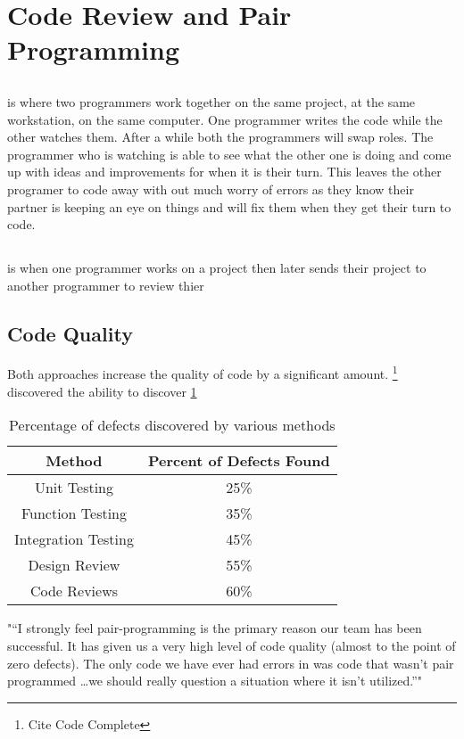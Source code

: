 \documentclass{article}
\begin{document}
\section{Code Review and Pair Programming}

\subsection{\PP}
\PP is where two programmers work together on the same project, at the same workstation, on the same computer. One programmer writes the code while the other watches them. After a while both the programmers will swap roles. The programmer who is watching is able to see what the other one is doing and come up with ideas and improvements for when it is their turn. This leaves the other programer to code away with out much worry of errors as they know their partner is keeping an eye on things and will fix them when they get their turn to code.

\subsection{\CR}
\CR is when one programmer works on a project then later sends their project to another programmer to review thier 

\subsection{Code Quality}

Both approaches increase the quality of code by a significant amount. \footnote{Cite Code Complete} discovered the ability to discover \ref{tab:defect}

\begin{table}[hb]
\begin{tabular}{c|c}
Method & Percent of Defects Found\\\hline
Unit Testing & 25\% \\
Function Testing & 35\% \\
Integration Testing & 45\% \\
Design Review & 55\% \\
Code Reviews & 60\%\\
\end{tabular}
\label{tab:defect}
\caption{Percentage of defects discovered by various methods}
\end{table}

\PP "“I strongly feel pair-programming is the primary reason our team has been successful. It has given us a very high level of code quality (almost to the point of zero defects). The only code we have ever had errors in was code that wasn’t pair programmed \dots we should really question a situation where it isn’t utilized.”"
\end{document}
